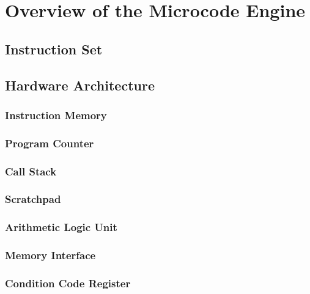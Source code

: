 \section{Overview of the Microcode Engine}

\subsection{Instruction Set}

\subsection{Hardware Architecture}

\subsubsection{Instruction Memory}

\subsubsection{Program Counter}

\subsubsection{Call Stack}

\subsubsection{Scratchpad}

\subsubsection{Arithmetic Logic Unit}

\subsubsection{Memory Interface}

\subsubsection{Condition Code Register}

